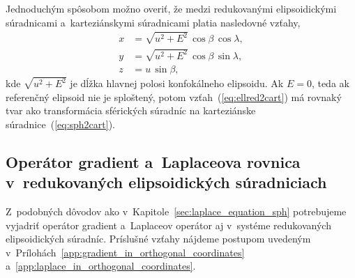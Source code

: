 \documentclass[a4paper, 12pt]{book}
\begin{document}
Jednoduchým spôsobom možno overiť, že medzi redukovanými elipsoidickými 
súradnicami a~karteziánskymi súradnicami platia nasledovné vzťahy,
%
\begin{equation}
\label{eq:ellred2cart}
\begin{split}
x &= \sqrt{u^2 + E^2} \, \cos\beta \, \cos\lambda{,}\\
y &= \sqrt{u^2 + E^2} \, \cos\beta \, \sin\lambda{,}\\
z &= u \, \sin\beta{,}
\end{split}
\end{equation}
%
kde $\sqrt{u^2 + E^2}$ je dĺžka hlavnej polosi konfokálneho elipsoidu.  Ak $E 
= 0$, teda ak referenčný elipsoid nie je sploštený, potom 
vzťah~(\ref{eq:ellred2cart}) má rovnaký tvar ako transformácia sférických 
súradníc na karteziánske súradnice~(\ref{eq:sph2cart}).



\subsection{Operátor gradient a~Laplaceova rovnica v~redukovaných 
elipsoidických súradniciach}
\label{sec:gradient_and_laplace_in_reduced_ell_coords}

Z~podobných dôvodov ako v~Kapitole~\ref{sec:laplace_equation_sph} potrebujeme 
vyjadriť operátor gradient a~Laplaceov operátor aj v~systéme redukovaných 
elipsoidických súradníc.  Príslušné vzťahy nájdeme postupom uvedeným 
v~Prílohách~\ref{app:gradient_in_orthogonal_coordinates} 
a~\ref{app:laplace_in_orthogonal_coordinates}.
\end{document}
